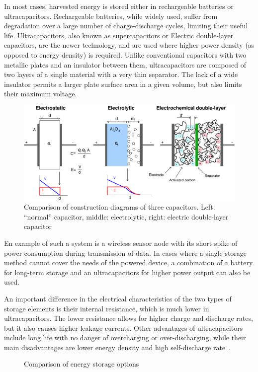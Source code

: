 \documentclass[a4paper,10pt]{article}
\begin{document}
In most cases, harvested energy is stored either in rechargeable batteries or ultracapacitors. Rechargeable batteries, while widely used, suffer from degradation over a large number of charge-discharge cycles, limiting their useful life. Ultracapacitors, also known as supercapacitors or Electric double-layer capacitors, are the newer technology, and are used where higher power density (as opposed to energy density) is required. Unlike conventional capacitors with two metallic plates and an insulator between them, ultracapacitors are composed of two layers of a single material with a very thin separator. The lack of a wide insulator permits a larger plate surface area in a given volume, but also limits their maximum voltage. 

\begin{figure}[h]
  \centering
  \includegraphics[width=.8\textwidth]{./Slike/Supercapacitor_diagram}
  \caption{Comparison of construction diagrams of three capacitors. Left: ``normal'' capacitor, middle: electrolytic, right: electric double-layer capacitor~\cite{wiki:edlc}}
  \label{fig:edlc-diagram}
\end{figure}

En example of such a system is a wireless sensor node with its short spike of power consumption during transmission of data. In cases where a single storage method cannot cover the needs of the powered device, a combination of a battery for long-term storage and an ultracapacitors for higher power output can also be used. 

An important difference in the electrical characteristics of the two types of storage elements is their internal resistance, which is much lower in ultracapacitors. The lower resistance allows for higher charge and discharge rates, but it also causes higher leakage currents. Other advantages of ultracapacitors include long life with no danger of overcharging or over-discharging, while their main disadvantages are lower energy density and high self-discharge rate~\cite{wiki:edlc}. 

\begin{figure}[!h]
\centering
\def\svgwidth{0.8\textwidth}
 
\caption{Comparison of energy storage options~\cite{wiki:edlc}}
\label{fig:storage-chart}
\end{figure}
\end{document}

